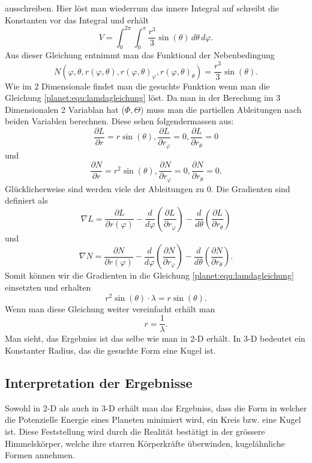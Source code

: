 ausschreiben.
Hier löst man wiederrum das innere Integral auf schreibt die Konstanten vor das Integral und erhält
\begin{equation*}
	V = \int_{0}^{2\pi}\int_{0}^{\pi}\frac{r^3}{3} \sin (\theta) \, d\theta \, d\varphi.
\end{equation*}
Aus dieser Gleichung entnimmt man das Funktional der Nebenbedingung
\begin{equation*}
	N(\varphi,\theta ,r(\varphi,\theta),r(\varphi,\theta)_\varphi,r(\varphi,\theta)_\theta) = \frac{r^3}{3} \sin (\theta).
\end{equation*}
Wie im 2 Dimensionale findet man die gesuchte Funktion wenn man die Gleichung \ref{planet:equ:lamdagleichung} löst.
Da man in der Berechung im 3 Dimensionalen 2 Variablan hat (\(\Phi,\Theta\)) muss man die partiellen Ableitungen nach beiden Variablen berechnen.
Diese sehen folgendermassen aus:
\begin{equation*}
	\frac{\partial L}{\partial r} = r  \sin (\theta) ,
	\frac{\partial L}{\partial r_\varphi} = 0 ,
	\frac{\partial L}{\partial r_\theta} = 0
\end{equation*}
und
\begin{equation*}
	\frac{\partial N}{\partial r} = r^2\sin (\theta) ,
	\frac{\partial N}{\partial r_\varphi} = 0 ,
	\frac{\partial N}{\partial r_\theta} = 0.
\end{equation*}
Glücklicherweise sind werden viele der Ableitungen zu 0.
Die Gradienten sind definiert als
\begin{equation*}
	\nabla L =  \frac{\partial L}{\partial r(\varphi)} 
	-\frac{d}{d\varphi}\left( \frac{\partial L}{\partial r_\varphi} \right)
	-\frac{d}{d\theta}\left( \frac{\partial L}{\partial r_\theta} \right)
\end{equation*}
und
\begin{equation*}
	\nabla N=  \frac{\partial N}{\partial r(\varphi)} 
	-\frac{d}{d\varphi}\left( \frac{\partial N}{\partial r_\varphi} \right)
	-\frac{d}{d\theta}\left( \frac{\partial N}{\partial r_\theta} \right).
\end{equation*}
Somit können wir die Gradienten in die Gleichung \ref{planet:equ:lamdagleichung} einsetzten und erhalten
\begin{equation*}
	r^2\sin (\theta) \cdot \lambda = r \sin (\theta).
\end{equation*}
Wenn man diese Gleichung weiter vereinfacht erhält man
\begin{equation*}
	r = \frac{1}{\lambda}.
\end{equation*}
Man sieht, das Ergebniss ist das selbe wie man in 2-D erhält.
In 3-D bedeutet ein Konstanter Radius, das die gesuchte Form eine Kugel ist.

\subsection{Interpretation der Ergebnisse}
Sowohl in 2-D als auch in 3-D erhält man das Ergebniss, dass die Form in welcher die Potenzielle Energie eines Planeten minimiert wird, ein Kreis bzw. eine Kugel ist.
Diese Feststellung wird durch die Realität bestätigt in der grössere Himmelskörper, welche ihre starren Körperkräfte überwinden, kugelähnliche Formen annehmen.

